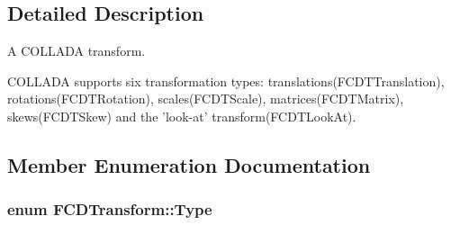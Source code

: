\subsection{Detailed Description}
A COLLADA transform.

COLLADA supports six transformation types: translations(FCDTTranslation), rotations(FCDTRotation), scales(FCDTScale), matrices(FCDTMatrix), skews(FCDTSkew) and the 'look-\/at' transform(FCDTLookAt). 

\subsection{Member Enumeration Documentation}
\hypertarget{classFCDTransform_a13e561c5e53aeaf84dedf4661cdc8921}{
\subsubsection[{Type}]{\setlength{\rightskip}{0pt plus 5cm}enum {\bf FCDTransform::Type}}}
\label{classFCDTransform_a13e561c5e53aeaf84dedf4661cdc8921}
